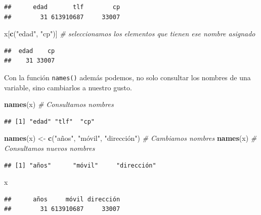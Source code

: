 \documentclass[11pt,]{book}
\newenvironment{Shaded}{\begin{snugshade}}{\end{snugshade}}
\newcommand{\CommentTok}[1]{\textcolor[rgb]{0.37,0.37,0.37}{\textit{#1}}}
\newcommand{\KeywordTok}[1]{\textcolor[rgb]{0.27,0.27,0.27}{\textbf{#1}}}
\newcommand{\NormalTok}[1]{#1}
\newcommand{\StringTok}[1]{\textcolor[rgb]{0.5,0.5,0.5}{#1}}
\begin{document}
\begin{verbatim}
##      edad       tlf        cp 
##        31 613910687     33007
\end{verbatim}

\begin{Shaded}
\begin{Highlighting}[]
\NormalTok{x[}\KeywordTok{c}\NormalTok{(}\StringTok{"edad"}\NormalTok{, }\StringTok{"cp"}\NormalTok{)] }\CommentTok{# seleccionamos los elementos que tienen ese nombre asignado}
\end{Highlighting}
\end{Shaded}

\begin{verbatim}
##  edad    cp 
##    31 33007
\end{verbatim}

Con la función \texttt{names()} además podemos, no solo consultar los nombres de una variable, sino cambiarlos a nuestro gusto.

\begin{Shaded}
\begin{Highlighting}[]
\KeywordTok{names}\NormalTok{(x) }\CommentTok{# Consultamos nombres}
\end{Highlighting}
\end{Shaded}

\begin{verbatim}
## [1] "edad" "tlf"  "cp"
\end{verbatim}

\begin{Shaded}
\begin{Highlighting}[]
\KeywordTok{names}\NormalTok{(x) <-}\StringTok{ }\KeywordTok{c}\NormalTok{(}\StringTok{"años"}\NormalTok{, }\StringTok{"móvil", "}\NormalTok{dirección") }\CommentTok{# Cambiamos nombres}
\KeywordTok{names}\NormalTok{(x) }\CommentTok{# Consultamos nuevos nombres}
\end{Highlighting}
\end{Shaded}

\begin{verbatim}
## [1] "años"      "móvil"     "dirección"
\end{verbatim}

\begin{Shaded}
\begin{Highlighting}[]
\NormalTok{x}
\end{Highlighting}
\end{Shaded}

\begin{verbatim}
##      años     móvil dirección 
##        31 613910687     33007
\end{verbatim}
\end{document}
